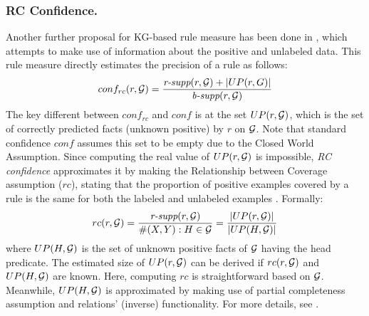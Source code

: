 \subsubsection{RC Confidence.} Another further proposal for KG-based rule measure has been done in \cite{DBLP:conf/www/ZupancD18}, which attempts to make use of information about the positive and unlabeled data. This rule measure directly estimates the precision of a rule as follows:
\[
conf_{rc}(r,\mathcal{G}) = \frac{\textit{r-supp}(r,\mathcal{G}) + |UP(r,G)|}{\textit{b-supp}(r,\mathcal{G})}
\]
The key different between $conf_{rc}$ and $conf$ is at the set $UP(r,\mathcal{G})$, which is the set of correctly predicted facts (unknown positive) by $r$ on $\mathcal{G}$. Note that standard confidence $conf$ assumes this set to be empty due to the Closed World Assumption. Since computing the real value of $UP(r,\mathcal{G})$ is impossible, \textit{RC confidence} approximates it by making the Relationship between Coverage assumption ($rc$), stating that the proportion of positive examples covered by a rule is the same for both the labeled and unlabeled examples \cite {DBLP:conf/www/ZupancD18}. Formally:
\[rc(r,\mathcal{G}) = \frac{\textit{r-supp}(r,\mathcal{G})}{\#(X,Y):H \in \mathcal{G}} = \frac{|UP(r,\mathcal{G})|}{|UP(H, \mathcal{G})|}\]
where $UP(H, \mathcal{G})$ is the set of unknown positive facts of $\mathcal{G}$ having the head predicate. The estimated size of $UP(r,\mathcal{G})$ can be derived if $rc(r,\mathcal{G})$ and $UP(H, \mathcal{G})$ are known. Here, computing $rc$ is straightforward based on $\mathcal{G}$. Meanwhile, $UP(H, \mathcal{G})$ is approximated by making use of partial completeness assumption and relations' (inverse) functionality. For more details, see \cite{DBLP:conf/www/ZupancD18}.



